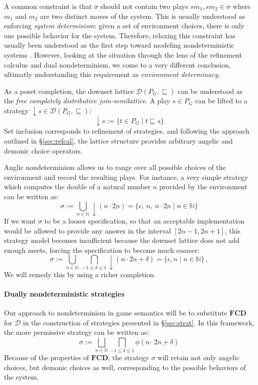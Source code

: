 \documentclass[format=sigplan,authordraft]{acmart}
\begin{document}
A common constraint is that $\sigma$
should not contain two plays $s m_1, s m_2 \in \sigma$
where $m_1$ and $m_2$ are two distinct moves of the system.
This is usually understood as
enforcing \emph{system determinism}:
given a set of environment choices,
there is only one possible behavior for the system.
Therefore,
relaxing this constraint has usually been understood
as the first step toward modeling nondeterministic systems
\cite{gsfnd}.
However,
looking at the situation through the lens of
the refinement calculus and dual nondeterminism,
we come to a very different conclusion,
ultimatly understanding this requirement as
\emph{environment determinacy}.

As a poset completion,
the downset lattice
$\mathcal{D}(P_G, {\sqsubseteq})$
can be understood as
the \emph{free completely distributive join-semilattice}.
A play $s \in P_G$ can be lifted to a strategy
${\downarrow} s \in \mathcal{D}(P_G, {\sqsubseteq})$:
\[
    {\downarrow} s := \{ t \in P_G \mid t \sqsubseteq s \}
\]
Set inclusion corresponds to refinement of strategies,
and following the approach outlined in \S\ref{sec:refcal},
the lattice structure provides
arbitrary angelic and demonic choice operators.

Anglic nondeterminism
allows us to range over all possible choices of the environment
and record the resulting plays.
For instance,
a very simple strategy which computes
the double of a natural number $n$
provided by the environment
can be written as:
\[
  \sigma :=
    \bigcup_{n \in \mathbb{N}} {\downarrow}(n \cdot \underline{2n}) =
    \{ \epsilon, \: n, \: n \cdot \underline{2n} \mid n \in \mathbb{N} \}
\]
If we want $\sigma$ to be a looser specification,
so that an acceptable implementation
would be allowed to provide any answer in the interval
$[2n - 1, 2n + 1]$,
this strategy model becomes insufficient
because the downset lattice does not add enough meets,
forcing the specification to become
much coarser:
\[
  \sigma :=
    \bigcup_{n \in \mathbb{N}} \:
    \bigcap_{-1 \le \delta \le 1}
    {\downarrow}(n \cdot \underline{2n+\delta}) =
    \{ \epsilon, n \mid n \in \mathbb{N} \} \,,
\]
We will remedy this by using a richer completion.


\paragraph{Dually nondeterministic strategies} %

Our approach to nondeterminism in game semantics
will be to substitute $\mathbf{FCD}$ for $\mathcal{D}$
in the construction of strategies presented in \S\ref{sec:strat}.
In this framework,
the more permissive strategy
can be written as:
\[
  \sigma :=
    \bigsqcup_{n \in \mathbb{N}}
    \bigsqcap_{-1 \le \delta \le 1}
    \phi(n \cdot \underline{2n + \delta})
\]
Because of the properties of $\mathbf{FCD}$,
the strategy $\sigma$ will retain
not only angelic choices,
but demonic choices as well,
corresponding to the possible behaviors
of the system.
\end{document}
